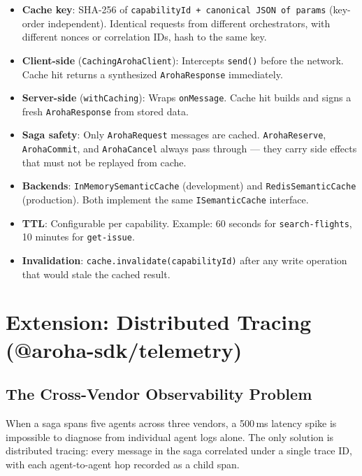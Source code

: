 \documentclass[11pt,a4paper]{article}
\begin{document}
\begin{itemize}[noitemsep]
  \item \textbf{Cache key}: SHA-256 of
        \texttt{capabilityId + canonical JSON of params} (key-order independent).
        Identical requests from different orchestrators, with different nonces or
        correlation IDs, hash to the same key.
  \item \textbf{Client-side} (\texttt{CachingArohaClient}): Intercepts
        \texttt{send()} before the network. Cache hit returns a synthesized
        \texttt{ArohaResponse} immediately.
  \item \textbf{Server-side} (\texttt{withCaching}): Wraps \texttt{onMessage}.
        Cache hit builds and signs a fresh \texttt{ArohaResponse} from stored data.
  \item \textbf{Saga safety}: Only \texttt{ArohaRequest} messages are cached.
        \texttt{ArohaReserve}, \texttt{ArohaCommit}, and \texttt{ArohaCancel} always
        pass through --- they carry side effects that must not be replayed from cache.
  \item \textbf{Backends}: \texttt{InMemorySemanticCache} (development) and
        \texttt{RedisSemanticCache} (production). Both implement the same
        \texttt{ISemanticCache} interface.
  \item \textbf{TTL}: Configurable per capability. Example: 60 seconds for
        \texttt{search-flights}, 10 minutes for \texttt{get-issue}.
  \item \textbf{Invalidation}: \texttt{cache.invalidate(capabilityId)} after any
        write operation that would stale the cached result.
\end{itemize}

\section{Extension: Distributed Tracing (@aroha-sdk/telemetry)}

\subsection{The Cross-Vendor Observability Problem}

When a saga spans five agents across three vendors, a 500\,ms latency spike is
impossible to diagnose from individual agent logs alone. The only solution is
distributed tracing: every message in the saga correlated under a single trace ID,
with each agent-to-agent hop recorded as a child span.
\end{document}

